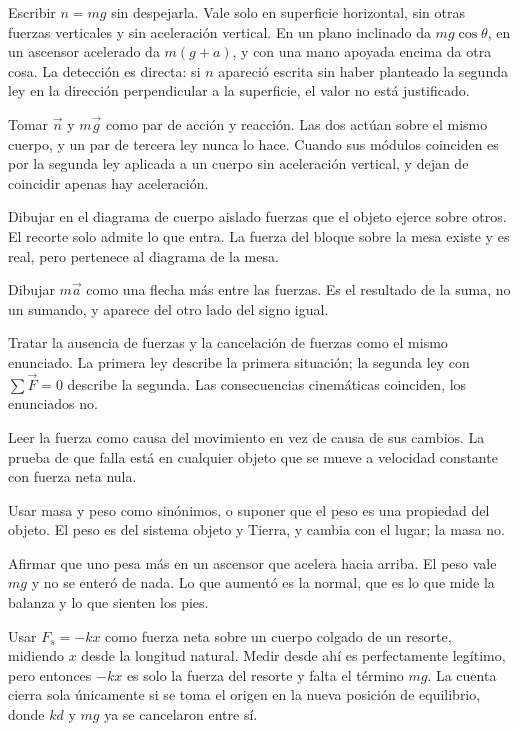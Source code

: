 \documentclass[11pt,openany]{book}
\begin{document}
\begin{erroresComunes}
  \item Escribir $n = mg$ sin despejarla. Vale solo en superficie horizontal, sin otras fuerzas verticales y sin aceleración vertical. En un plano inclinado da $mg\cos\theta$, en un ascensor acelerado da $m(g+a)$, y con una mano apoyada encima da otra cosa. La detección es directa: si $n$ apareció escrita sin haber planteado la segunda ley en la dirección perpendicular a la superficie, el valor no está justificado.
  \item Tomar $\vec n$ y $m\vec g$ como par de acción y reacción. Las dos actúan sobre el mismo cuerpo, y un par de tercera ley nunca lo hace. Cuando sus módulos coinciden es por la segunda ley aplicada a un cuerpo sin aceleración vertical, y dejan de coincidir apenas hay aceleración.
  \item Dibujar en el diagrama de cuerpo aislado fuerzas que el objeto ejerce sobre otros. El recorte solo admite lo que entra. La fuerza del bloque sobre la mesa existe y es real, pero pertenece al diagrama de la mesa.
  \item Dibujar $m\vec a$ como una flecha más entre las fuerzas. Es el resultado de la suma, no un sumando, y aparece del otro lado del signo igual.
  \item Tratar la ausencia de fuerzas y la cancelación de fuerzas como el mismo enunciado. La primera ley describe la primera situación; la segunda ley con $\sum\vec F = 0$ describe la segunda. Las consecuencias cinemáticas coinciden, los enunciados no.
  \item Leer la fuerza como causa del movimiento en vez de causa de sus cambios. La prueba de que falla está en cualquier objeto que se mueve a velocidad constante con fuerza neta nula.
  \item Usar masa y peso como sinónimos, o suponer que el peso es una propiedad del objeto. El peso es del sistema objeto y Tierra, y cambia con el lugar; la masa no.
  \item Afirmar que uno pesa más en un ascensor que acelera hacia arriba. El peso vale $mg$ y no se enteró de nada. Lo que aumentó es la normal, que es lo que mide la balanza y lo que sienten los pies.
  \item Usar $F_s = -kx$ como fuerza neta sobre un cuerpo colgado de un resorte, midiendo $x$ desde la longitud natural. Medir desde ahí es perfectamente legítimo, pero entonces $-kx$ es solo la fuerza del resorte y falta el término $mg$. La cuenta cierra sola únicamente si se toma el origen en la nueva posición de equilibrio, donde $kd$ y $mg$ ya se cancelaron entre sí.
\end{erroresComunes}
\end{document}

